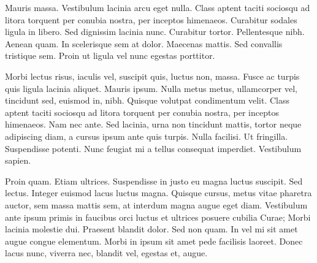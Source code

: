 \documentclass[10pt]{deptletter}
\begin{document}
Mauris massa. Vestibulum lacinia arcu eget nulla. Class aptent taciti
sociosqu ad litora torquent per conubia nostra, per inceptos himenaeos.
Curabitur sodales ligula in libero. Sed dignissim lacinia nunc. Curabitur
tortor. Pellentesque nibh. Aenean quam. In scelerisque sem at dolor.
Maecenas mattis. Sed convallis tristique sem. Proin ut ligula vel nunc
egestas porttitor. 

Morbi lectus risus, iaculis vel, suscipit quis, luctus non, massa. Fusce ac
turpis quis ligula lacinia aliquet. Mauris ipsum. Nulla metus metus,
ullamcorper vel, tincidunt sed, euismod in, nibh. Quisque volutpat
condimentum velit. Class aptent taciti sociosqu ad litora torquent per
conubia nostra, per inceptos himenaeos. Nam nec ante. Sed lacinia, urna non
tincidunt mattis, tortor neque adipiscing diam, a cursus ipsum ante quis
turpis. Nulla facilisi. Ut fringilla. Suspendisse potenti. Nunc feugiat mi
a tellus consequat imperdiet. Vestibulum sapien. 

Proin quam. Etiam ultrices. Suspendisse in justo eu magna luctus suscipit.
Sed lectus. Integer euismod lacus luctus magna. Quisque cursus, metus vitae
pharetra auctor, sem massa mattis sem, at interdum magna augue eget diam.
Vestibulum ante ipsum primis in faucibus orci luctus et ultrices posuere
cubilia Curae; Morbi lacinia molestie dui. Praesent blandit dolor. Sed non
quam. In vel mi sit amet augue congue elementum. Morbi in ipsum sit amet
pede facilisis laoreet. Donec lacus nunc, viverra nec, blandit vel, egestas
et, augue. 


\end{document}
